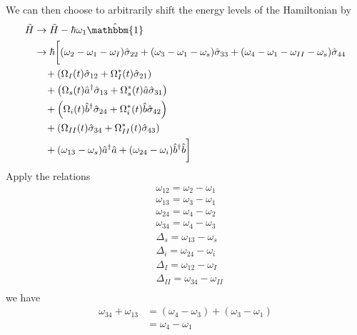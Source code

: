 \documentclass[aps,pra,showpacs,amsmath,amssymb,nofootinbib,longbibliography,superscriptaddress
]{revtex4-1}
\theoremstyle{definition}
\theoremstyle{remark}
\newcommand{\0}{\hat{0}}
\begin{document}
We can then choose to arbitrarily shift the energy levels of the Hamiltonian by
\begin{align}
    \tilde{H}
    &\rightarrow
    \tilde{H} - \hbar \omega_1 \hat{\mathbbm{1}} \nonumber \\
    &\rightarrow
    \hbar \biggl[
        (\omega_2 - \omega_1 - \omega_I) \hat{\sigma}_{22} +
        (\omega_3 - \omega_1 - \omega_s) \hat{\sigma}_{33} +
        (\omega_4 - \omega_1 - \omega_{II} - \omega_s) \hat{\sigma}_{44} \nonumber \\
        &\;\;\;\;+
        \left(
            \Omega_{I}(t) \hat{\sigma}_{12} +
            \Omega_{I}^*(t) \hat{\sigma}_{21}
        \right)\nonumber \\
        &\;\;\;\;+
        \left(
            \Omega_{s}(t) \hat{a}^{\dagger} \hat{\sigma}_{13} +
            \Omega_{s}^*(t) \hat{a} \hat{\sigma}_{31}
        \right) \nonumber \\
        &\;\;\;\;+
        \left(
            \Omega_{i}(t) \hat{b}^{\dagger} \hat{\sigma}_{24} +
            \Omega_{i}^*(t) \hat{b} \hat{\sigma}_{42}
        \right) \nonumber \\
        &\;\;\;\;+
        \left(
            \Omega_{II}(t) \hat{\sigma}_{34} +
            \Omega_{II}^*(t) \hat{\sigma}_{43}
        \right) \nonumber \\
        &\;\;\;\;+
        (\omega_{13} - \omega_s) \hat{a}^{\dagger}\hat{a} +
        (\omega_{24} - \omega_i) \hat{b}^{\dagger}\hat{b}
    \biggr] \nonumber \\
\end{align}
Apply the relations
\begin{align}
    &\omega_{12} = \omega_2 - \omega_1\\
    &\omega_{13} = \omega_3 - \omega_1\\
    &\omega_{24} = \omega_4 - \omega_2\\
    &\omega_{34} = \omega_4 - \omega_3\\
    &\Delta_s = \omega_{13} - \omega_s\\
    &\Delta_i = \omega_{24} - \omega_i\\
    &\Delta_I = \omega_{12} - \omega_I\\
    &\Delta_{II} = \omega_{34} - \omega_{II}\\
\end{align}
we have
\begin{align}
    \omega_{34} + \omega_{13} &= (\omega_4 - \omega_3) + (\omega_3 - \omega_1)\nonumber \\
    &= \omega_4 - \omega_1
\end{align}
\end{document}
